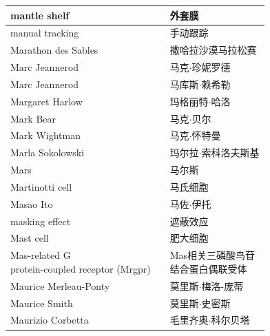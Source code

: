 \begin{longtable}{lll}
	\midrule
	mantle shelf   && 外套膜  \\
	
	\midrule
	manual tracking   && 手动跟踪  \\
	
	\midrule
	Marathon des Sables   && 撒哈拉沙漠马拉松赛  \\
	
	\midrule
	Marc Jeannerod   && 马克$\cdot$珍妮罗德  \\
	
	\midrule
	Marc Jeannerod   && 马库斯$\cdot$赖希勒  \\
	
	\midrule
	Margaret Harlow   && 玛格丽特$\cdot$哈洛  \\
	
	\midrule
	Mark Bear   && 马克$\cdot$贝尔  \\
	
	\midrule
	Mark Wightman   && 马克$\cdot$怀特曼  \\
	
	\midrule
	Marla Sokolowski   && 玛尔拉$\cdot$索科洛夫斯基 \\
	
	\midrule
	Mars   && 马尔斯 \\
	
	\midrule
	Martinotti cell   && 马氏细胞 \\
	
	\midrule
	Masao Ito   && 马佐$\cdot$伊托 \\
	
	\midrule
	masking effect   && 遮蔽效应 \\
	
	\midrule
	Mast cell   && 肥大细胞 \\
	
	\midrule
	\makecell[l]{Mas-related G \\protein-coupled receptor (Mrgpr)}  && \makecell[l]{Mas相关三磷酸鸟苷\\结合蛋白偶联受体} \\
	
	\midrule
	Maurice Merleau-Ponty   && 莫里斯$\cdot$梅洛-庞蒂  \\
	
	\midrule
	Maurice Smith   && 莫里斯$\cdot$史密斯  \\
	
	\midrule
	Maurizio Corbetta   && 毛里齐奥$\cdot$科尔贝塔  \\
	

\end{longtable}
